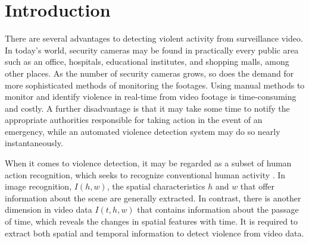 \section{Introduction}	
    \label{sec:introduction}

There are several advantages to detecting violent activity from surveillance video.
In today's world, security cameras may be found in practically every public area such as an office, hospitals, educational institutes, and shopping malls, among other places. As the number of security cameras grows, so does the demand for more sophisticated methods of monitoring the footages. Using manual methods to monitor and identify violence in real-time from video footage is time-consuming and costly. A further disadvantage is that it may take some time to notify the appropriate authorities responsible for taking action in the event of an emergency, while an automated violence detection system may do so nearly instantaneously.


When it comes to violence detection, it may be regarded as a subset of human action recognition, which seeks to recognize conventional human activity \cite{cheng2019rwf}.
In image recognition, $I(h,w)$, the spatial characteristics $h$ and $w$ that offer information about the scene are generally extracted. In contrast, there is another dimension in video data $I(t,h,w)$ that contains information about the passage of time, which reveals the changes in spatial features with time.
It is required to extract both spatial and temporal information to detect violence from video data. 

